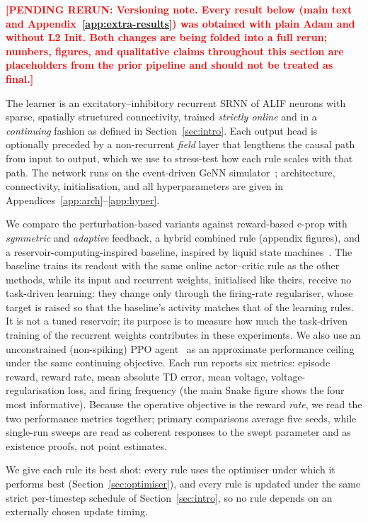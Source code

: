 \documentclass[10pt,twocolumn]{article}
\newcommand{\pending}[1]{\textcolor{red}{\bfseries[PENDING RERUN#1]}}
\newcommand{\variant}[1]{\textsf{#1}} %
\begin{document}
\pending{: \textbf{Versioning note.} Every result below (main text and
Appendix~\ref{app:extra-results}) was obtained with plain Adam and without
L2 Init. Both changes are being folded into a full rerun; numbers, figures,
and qualitative claims throughout this section are placeholders from the
prior pipeline and should not be treated as final.}

The learner is an excitatory--inhibitory recurrent SRNN of ALIF neurons with
sparse, spatially structured connectivity, trained \emph{strictly online} and in
a \emph{continuing} fashion as defined in Section~\ref{sec:intro}. Each output
head is optionally preceded by a non-recurrent \emph{field} layer that lengthens
the causal path from input to output, which we use to stress-test how each rule
scales with that path. The network runs on the event-driven GeNN
simulator~\citep{Yavuz2016GeNN}; architecture, connectivity, initialisation, and
all hyperparameters are given in Appendices~\ref{app:arch}--\ref{app:hyper}.

We compare the perturbation-based variants against reward-based e-prop with
\emph{symmetric} and \emph{adaptive} feedback, a hybrid \variant{combined} rule
(appendix figures), and a reservoir-computing-inspired \variant{baseline}, inspired by liquid state
machines~\citep{Maass2002LSM}.
The baseline trains its readout with the same online actor--critic rule as
the other methods, while its input and recurrent weights, initialised like
theirs, receive no task-driven learning: they change only through the
firing-rate regulariser, whose target is raised so that the baseline's
activity matches that of the learning rules. It is not a tuned reservoir;
its purpose is to measure how much the task-driven training of the recurrent
weights contributes in these experiments. We also use an unconstrained
(non-spiking) PPO agent~\citep{schulman2017ppo,schulman2016gae} as an approximate
performance ceiling under the same continuing objective. Each run reports six
metrics: episode reward, reward rate, mean absolute TD error, mean voltage,
voltage-regularisation loss, and firing frequency (the main Snake figure shows
the four most informative). Because the operative
objective is the reward \emph{rate}, we read the
two performance metrics together; primary comparisons average five seeds, while
single-run sweeps are read as coherent responses to the swept parameter and as
existence proofs, not point estimates.

We give each rule its best shot: every rule uses the optimiser under which it
performs best (Section~\ref{sec:optimiser}), and every rule is updated under
the same strict per-timestep schedule of Section~\ref{sec:intro}, so no rule
depends on an externally chosen update timing.
\end{document}
